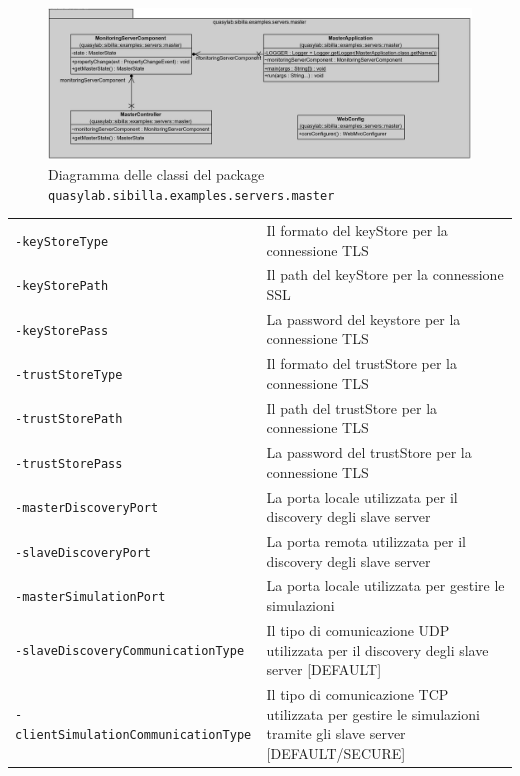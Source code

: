 \begin{figure}[H]
    \includegraphics[width=\linewidth]{images/quasylab.sibilla.examples.servers.master.png}
    \captionsetup{justification=centering}
    \caption{Diagramma delle classi del package \texttt{quasylab.sibilla.examples.servers.master}}
  \end{figure}

\begin{table}[H]
    \begin{tabularx}{\linewidth}{ l X }
        \texttt{-keyStoreType}         & Il formato del keyStore per la connessione TLS              \\
        \texttt{-keyStorePath}         & Il path del keyStore per la connessione SSL                  \\
        \texttt{-keyStorePass}         & La password del keystore per la connessione TLS               \\
        \texttt{-trustStoreType}       & Il formato del trustStore per la connessione TLS            \\
        \texttt{-trustStorePath}       & Il path del trustStore per la connessione TLS                \\
        \texttt{-trustStorePass}       & La password del trustStore per la connessione TLS            \\
        \texttt{-masterDiscoveryPort}  & La porta locale utilizzata per il discovery degli slave server \\
        \texttt{-slaveDiscoveryPort}   & La porta remota utilizzata per il discovery degli slave server \\
        \texttt{-masterSimulationPort} & La porta locale utilizzata per gestire le simulazioni        \\
        \texttt{-slaveDiscoveryCommunicationType}   & Il tipo di comunicazione UDP utilizzata per il discovery degli slave server {[}DEFAULT{]}     \\
        \texttt{-clientSimulationCommunicationType} & Il tipo di comunicazione TCP utilizzata per gestire le simulazioni tramite gli slave server {[}DEFAULT/SECURE{]}
    \end{tabularx}
\end{table}

